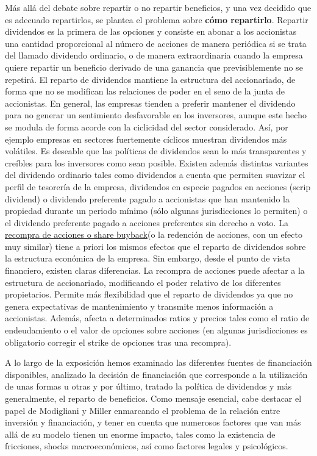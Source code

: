\documentclass{nuevotema}
\begin{document}
Más allá del debate sobre repartir o no repartir beneficios, y una vez decidido que es adecuado repartirlos, se plantea el problema sobre \textbf{cómo repartirlo}. Repartir dividendos es la primera de las opciones y consiste en abonar a los accionistas una cantidad proporcional al número de acciones de manera periódica si se trata del llamado dividendo ordinario, o de manera extraordinaria cuando la empresa quiere repartir un beneficio derivado de una ganancia que previsiblemente no se repetirá. El reparto de dividendos mantiene la estructura del accionariado, de forma que no se modifican las relaciones de poder en el seno de la junta de accionistas. En general, las empresas tienden a preferir mantener el dividendo para no generar un sentimiento desfavorable en los inversores, aunque este hecho se modula de forma acorde con la ciclicidad del sector considerado. Así, por ejemplo empresas en sectores fuertemente cíclicos muestran dividendos más volátiles. Es deseable que las políticas de dividendos sean lo más transparentes y creíbles para los inversores como sean posible. Existen además distintas variantes del dividendo ordinario tales como dividendos a cuenta que permiten suavizar el perfil de tesorería de la empresa, dividendos en especie pagados en acciones (scrip dividend) o dividendo preferente pagado a accionistas que han mantenido la propiedad durante un periodo mínimo (sólo algunas jurisdicciones lo permiten) o el dividendo preferente pagado a acciones preferentes sin derecho a voto. La \underline{recompra de acciones o share buyback}(o la redención de acciones, con un efecto muy similar) tiene a priori los mismos efectos que el reparto de dividendos sobre la estructura económica de la empresa. Sin embargo, desde el punto de vista financiero, existen claras diferencias. La recompra de acciones puede afectar a la estructura de accionariado, modificando el poder relativo de los diferentes propietarios. Permite más flexibilidad que el reparto de dividendos ya que no genera expectativas de mantenimiento y transmite menos información a accionistas. Además, afecta a determinados ratios y precios tales como el ratio de endeudamiento o el valor de opciones sobre acciones (en algunas jurisdicciones es obligatorio corregir el strike de opciones tras una recompra). 

A lo largo de la exposición hemos examinado las diferentes fuentes de financiación disponibles, analizado la decisión de financiación que corresponde a la utilización de unas formas u otras y por último, tratado la política de dividendos y más generalmente, el reparto de beneficios. Como mensaje esencial, cabe destacar el papel de Modigliani y Miller enmarcando el problema de la relación entre inversión y financiación, y tener en cuenta que numerosos factores que van más allá de su modelo tienen un enorme impacto, tales como la existencia de fricciones, shocks macroeconómicos, así como factores legales y psicológicos.
\end{document}
